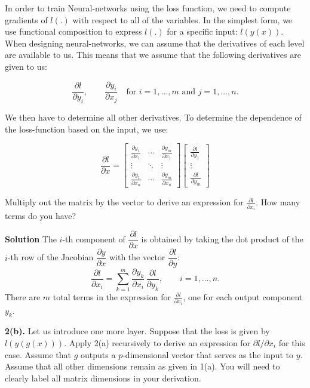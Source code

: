 \documentclass[11pt]{article}
\begin{document}
	In order to train Neural-networks using the loss function, we need to compute gradients of $l(.)$ with respect to all of the variables. In the simplest form, we use functional composition to express $l(.)$ for a specific input: $l(y(x))$. When designing neural-networks, we can assume that the derivatives of each level are available to us. This means that we assume that the following derivatives are given to us:
	
	\[
	\frac{\partial l}{\partial y_i}, \qquad \frac{\partial y_i}{\partial x_j}
	\quad \text{for } i = 1,\dots,m \text{ and } j = 1,\dots,n.
	\]
	
	We then have to determine all other derivatives. To determine the dependence
	of the loss-function based on the input, we use:
	
	\[
	\frac{\partial l}{\partial x} 
	= 
	\begin{bmatrix}
		\frac{\partial y_1}{\partial x_1} & \cdots & \frac{\partial y_m}{\partial x_1} \\
		\vdots & \ddots & \vdots \\
		\frac{\partial y_1}{\partial x_n} & \cdots & \frac{\partial y_m}{\partial x_n}
	\end{bmatrix}
	\begin{bmatrix}
		\frac{\partial l}{\partial y_1} \\ \vdots \\ \frac{\partial l}{\partial y_m}
	\end{bmatrix}
	\]
	
	Multiply out the matrix by the vector to derive an expression for $\frac{\partial l}{\partial x_i}$. How many terms do you have?
	
	\noindent\textbf{Solution}
	The $i$-th component of $\dfrac{\partial l}{\partial x}$ is obtained by taking the
	dot product of the $i$-th row of the Jacobian $\dfrac{\partial y}{\partial x}$ with
	the vector $\dfrac{\partial l}{\partial y}$:
	\[
	\frac{\partial l}{\partial x_i}
	= \sum_{k=1}^{m}
	\frac{\partial y_k}{\partial x_i}\,
	\frac{\partial l}{\partial y_k},
	\qquad i = 1,\dots,n.
	\]
	There are $m$ total terms in the expression for $\frac{\partial l}{\partial x_i}$, one for each output component $y_k$.
	
	
	\vspace{0.5em}
	\noindent\textbf{2(b).} Let us introduce one more layer. Suppose that the loss is given by \(l(y(g(x)))\). Apply 2(a) recursively to derive an expression for \(\partial l / \partial x_i\) for this case. Assume that \(g\) outputs a \(p\)-dimensional vector that serves as the input to \(y\).
	Assume that all other dimensions remain as given in 1(a). You will need to clearly label all matrix dimensions in your derivation.
	
\end{document}
